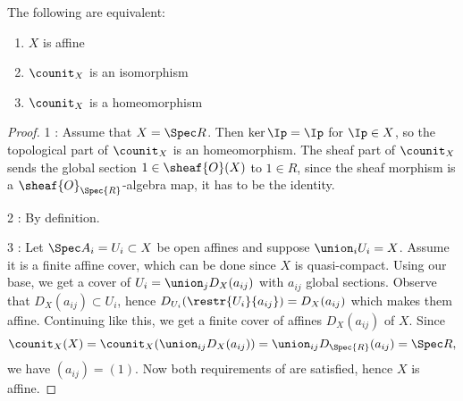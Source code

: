 \begin{lemma}
The following are equivalent:
\begin{enumerate}
	\item $X$ is affine
	\item $\counit_X$ is an isomorphism
	\item $\counit_X$ is a homeomorphism
\end{enumerate}
\end{lemma}

\begin{proof}
1 :
Assume that $X = \Spec R$.
Then $\ker{\Ip} = \Ip$ for $\Ip \in X$, so the topological part of $\counit_X$ is an homeomorphism.
The sheaf part of $\counit_X$ sends the global section $1\in \sheaf{O}(X)$ to $1 \in R$,
since the sheaf morphism is a $\sheaf{O}_{\Spec{R}}$-algebra map, it has to be the identity.

2 :
By definition.

3 :
Let $\Spec A_i = U_i \subset X$ be open affines
and suppose $\union_i U_i = X$.
Assume it is a finite affine cover, which can be done since $X$ is quasi-compact.
Using our base, 
we get a cover of $U_i = \union_j D_X(a_{ij})$ 
with $a_{ij}$ global sections.
Observe that $D_X(a_{ij})\subset U_i$, 
hence $D_{U_i}(\restr{U_i}{a_{ij}}) = D_X(a_{ij})$
which makes them affine.
Continuing like this, 
we get a finite cover of affines $D_X(a_{ij})$ of $X$.
Since 
\[ \counit_X(X) = \counit_X(\union_{ij} D_X(a_{ij})) = \union_{ij} D_{\Spec{R}}(a_{ij}) = \Spec R,\]
we have $(a_{ij})=(1)$.
Now both requirements of \cite[Ex.2.17]{harts} are satisfied,
hence $X$ is affine.
\end{proof}
